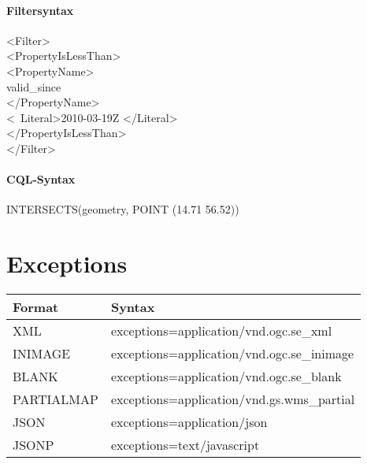 \paragraph{Filtersyntax\\}
\textless Filter\textgreater\\
    \textless PropertyIsLessThan\textgreater\\
        \textless PropertyName\textgreater\\
            valid\_since\\
        \textless/PropertyName\textgreater\\
        \textless\ Literal\textgreater 2010-03-19Z \textless/Literal\textgreater\\
    \textless/PropertyIsLessThan\textgreater\\
\textless/Filter\textgreater\\

\paragraph{CQL-Syntax\\}
INTERSECTS(geometry, POINT (14.71 56.52))



\section{Exceptions}
\begin{tabular}{ll} 
Format & Syntax \\ 
\hline 
XML & exceptions=application/vnd.ogc.se\_xml\\ 
\hline 
INIMAGE & exceptions=application/vnd.ogc.se\_inimage \\ 
\hline 
BLANK & exceptions=application/vnd.ogc.se\_blank \\ 
\hline 
PARTIALMAP & exceptions=application/vnd.gs.wms\_partial \\ 
\hline 
JSON & exceptions=application/json \\ 
\hline 
JSONP & exceptions=text/javascript \\ 
\hline 
\end{tabular} 
